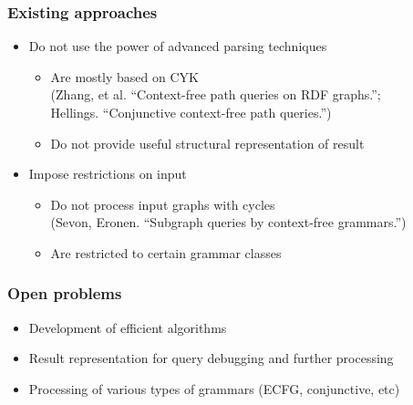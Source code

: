 \documentclass[xcolor=table]{beamer}
\begin{document}
\begin{frame}
  \transwipe[direction=90]
  \frametitle{Existing approaches}
  \begin{itemize}
    \item Do not use the power of advanced parsing techniques
    \begin{itemize}
       \item Are mostly based on CYK \\ (Zhang, et al. ``Context-free path queries on RDF graphs.''; \\ Hellings. ``Conjunctive context-free path queries.'')
       \item Do not provide useful structural representation of result
     \end{itemize}
    \item Impose restrictions on input
    \begin{itemize}
       \item Do not process input graphs with cycles \\ (Sevon, Eronen. ``Subgraph queries by context-free grammars.'')
       \item Are restricted to certain grammar classes
     \end{itemize}
  \end{itemize}
\end{frame}

\begin{frame}
  \transwipe[direction=90]
  \frametitle{Open problems}
  \begin{itemize}
    \item Development of efficient algorithms
    \item Result representation for query debugging and further processing 
    \item Processing of various types of grammars (ECFG, conjunctive, etc)
  \end{itemize}
\end{frame}

\end{document}
